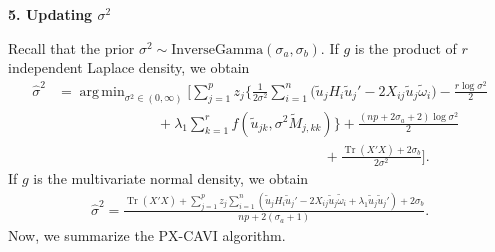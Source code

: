 \documentclass[pdftex, noinfoline, letter]{imsart}
\DeclareMathOperator{\Tr}{Tr}
\DeclareMathOperator*{\argmin}{arg\,min}
\theoremstyle{plain}
\begin{document}
{\bf 5. Updating $\sigma^2$}

Recall that the prior $\sigma^2 \sim \text{InverseGamma}(\sigma_a, \sigma_b)$. If $g$ is the product of $r$ independent Laplace density, we obtain 
\begin{align}
\widehat \sigma^2 & = \argmin_{\sigma^2 \in (0, \infty)} 
\Bigg[
\sum_{j=1}^p z_j \Big\{
\frac{1}{2\sigma^2} \sum_{i=1}^n \Big( \widetilde  u_j H_i \widetilde  u_j' - 2X_{ij} \widetilde  u_j \widetilde  \omega_i \Big)
- \frac{r\log \sigma^2}{2} \nonumber\\
& \hspace{3cm}
+ \lambda_1 \sum_{k=1}^r f(\widetilde  u_{jk}, \sigma^2 \widetilde  M_{j,kk})
\Big\}
+\frac{(np+2\sigma_a+2)\log \sigma^2}{2} \label{eqn:cavi-sigma}\\
&\hspace{8cm}+ \frac{\Tr(X'X) + 2\sigma_b}{2\sigma^2} 
\Bigg].\nonumber
\end{align}
If $g$ is the multivariate normal density, we obtain
\begin{align}
\widehat  \sigma^2  = \frac{
\Tr(X'X) + \sum_{j=1}^p z_j \sum_{i=1}^n 
\left(
\widetilde  u_j H_i \widetilde  u_j'
- 2X_{ij} \widetilde  u_j \widetilde  \omega_i + \lambda_1 \widetilde  u_j \widetilde  u_j'
\right)  + 2\sigma_b
}{ 
np + 2(\sigma_a + 1)}.
\label{eqn:cavi-sigma-mvn}
\end{align}
Now, we summarize the PX-CAVI algorithm. 
\end{document}
